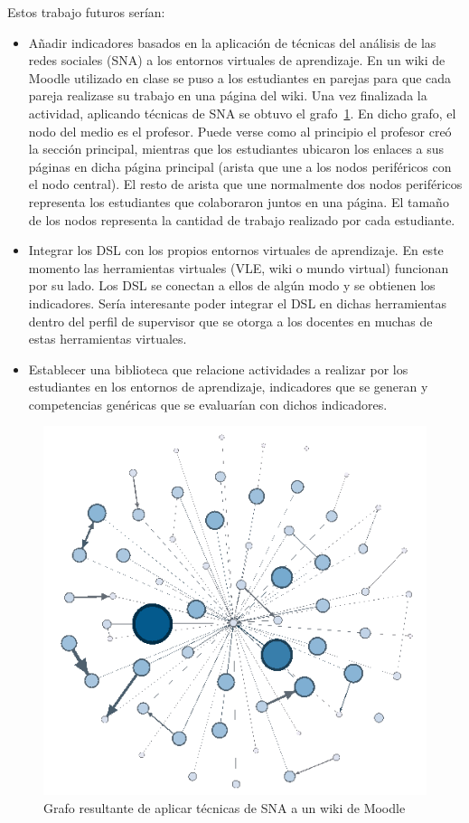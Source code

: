 Estos trabajo futuros serían:
\begin{itemize}
\item Añadir indicadores basados en la aplicación de técnicas del análisis de las redes sociales (SNA) a los entornos virtuales de aprendizaje. En un wiki de Moodle utilizado en clase se puso a los estudiantes en parejas para que cada pareja realizase su trabajo en una página del wiki. Una vez finalizada la actividad, aplicando técnicas de SNA se obtuvo el grafo~\ref{fig:SNAWiki}. En dicho grafo, el nodo del medio es el profesor. Puede verse como al principio el profesor creó la sección principal, mientras que los estudiantes ubicaron los enlaces a sus páginas en dicha página principal (arista que une a los nodos periféricos con el nodo central). El resto de arista que une normalmente dos nodos periféricos representa los estudiantes que colaboraron juntos en una página. El tamaño de los nodos representa la cantidad de trabajo realizado por cada estudiante.
\item Integrar los DSL con los propios entornos virtuales de aprendizaje. En este momento las herramientas virtuales (VLE, wiki o mundo virtual) funcionan por su lado. Los DSL se conectan a ellos de algún modo y se obtienen los indicadores. Sería interesante poder integrar el DSL en dichas herramientas dentro del perfil de supervisor que se otorga a los docentes en muchas de estas herramientas virtuales.
\item Establecer una biblioteca que relacione actividades a realizar por los estudiantes en los entornos de aprendizaje, indicadores que se generan y competencias genéricas que se evaluarían con dichos indicadores.
\end{itemize}

\begin{figure}
  \begin{center}
    \includegraphics[scale=0.5]{SNA-Grafo-Wiki-SD.png}
  \end{center}
  \caption{Grafo resultante de aplicar técnicas de SNA a un wiki de Moodle}
  \label{fig:SNAWiki}
\end{figure}

